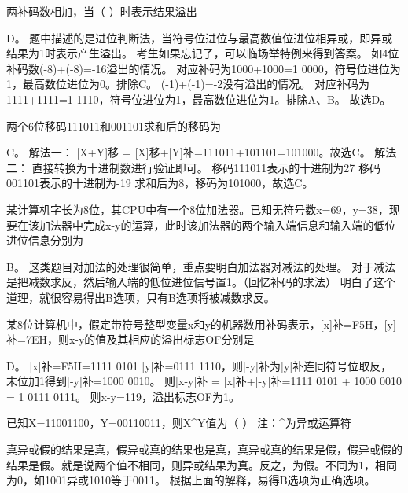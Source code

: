 \question 两补码数相加，当（ ）时表示结果溢出
\par{}
\begin{solution}D。
题中描述的是进位判断法，当符号位进位与最高数值位进位相异或，即异或结果为1时表示产生溢出。
考生如果忘记了，可以临场举特例来得到答案。
如4位补码数(-8)+(-8)=-16溢出的情况。 对应补码为1000+1000=1
0000，符号位进位为1，最高数位进位为0。排除C。
(-1)+(-1)=-2没有溢出的情况。 对应补码为1111+1111=1
1110，符号位进位为1，最高数位进位为1。排除A、B。 故选D。
\end{solution}
\question 两个6位移码111011和001101求和后的移码为
\par{}
\begin{solution}C。 解法一： {[}X+Y{]}移 =
{[}X{]}移+{[}Y{]}补=111011+101101=101000。故选C。 解法二：
直接转换为十进制数进行验证即可。 移码111011表示的十进制为27
移码001101表示的十进制为-19 求和后为8，移码为101000，故选C。
\end{solution}
\question 某计算机字长为8位，其CPU中有一个8位加法器。已知无符号数x=69，y=38，现要在该加法器中完成x-y的运算，此时该加法器的两个输入端信息和输入端的低位进位信息分别为
\par{}
\begin{solution}B。 这类题目对加法的处理很简单，重点要明白加法器对减法的处理。
对于减法是把减数求反，然后输入端的低位进位信号置1。（回忆补码的求法）
明白了这个道理，就很容易得出B选项，只有B选项将被减数求反。
\end{solution}
\question 某8位计算机中，假定带符号整型变量x和y的机器数用补码表示，{[}x{]}补=F5H，{[}y{]}补=7EH，则x-y的值及其相应的溢出标志OF分别是
\par{}
\begin{solution}D。 {[}x{]}补=F5H=1111 0101 {[}y{]}补=0111
1110，则{[}-y{]}补为{[}y{]}补连同符号位取反，末位加1得到{[}-y{]}补=1000
0010。 则{[}x-y{]}补 = {[}x{]}补+{[}-y{]}补=1111 0101 + 1000 0010 = 1
0111 0111。 则x-y=119，溢出标志OF为1。
\end{solution}
\question 已知X=11001100，Y=00110011，则X\^{}Y值为（ ） 注：\^{}为异或运算符
\par{}
\begin{solution}真异或假的结果是真，假异或真的结果也是真，真异或真的结果是假，假异或假的结果是假。就是说两个值不相同，则异或结果为真。反之，为假。不同为1，相同为0，如1001异或1010等于0011。
根据上面的解释，易得B选项为正确选项。
\end{solution}
